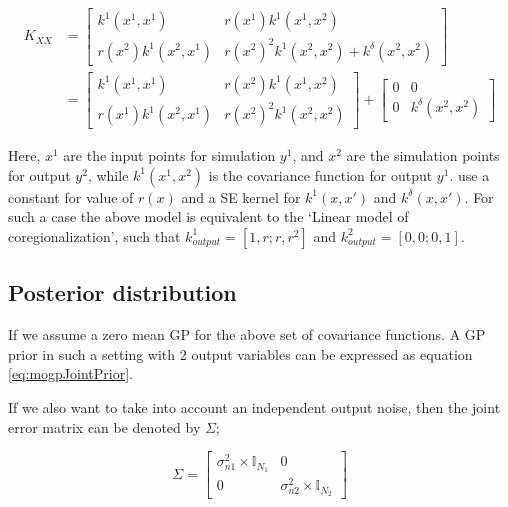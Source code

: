 \begin{equation}\label{eqJointCovarianceMultiFidelity}
         \begin{aligned}
           K_{XX}   & = \begin{bmatrix} k^{1}(x^{1}, x^{1}) & r(x^{1})k^{1}(x^{1}, x^{2})   \\
           r(x^{2})k^{1}(x^{2}, x^{1}) & r(x^{2})^2k^{1}(x^{2}, x^{2}) + k^{\delta}(x^{2}, x^{2}) \end{bmatrix} \\ 
           & = \begin{bmatrix} k^{1}(x^{1}, x^{1}) & r(x^{2})k^{1}(x^{1}, x^{2})   \\ r(x^{1})k^{1}(x^{2}, x^{1}) & r(x^{2})^2k^{1}(x^{2}, x^{2}) \end{bmatrix} 
           +  
\begin{bmatrix} 0 & 0 \\ 0 & k^{\delta}(x^{2}, x^{2}) \end{bmatrix} 
         \end{aligned}
\end{equation}

Here, $x^{1}$ are the input points for simulation $y^{1}$, and $x^{2}$ are the simulation points for output $y^{2}$, while $k^{1}(x^{1}, x^{2})$ is the covariance function for output $y^{1}$. \cite{kennedy2000predicting} use a constant for value of $r(x)$ and a SE kernel for $k^{1}(x, x')$ and $k^{\delta}(x, x')$.  For such a case the above model is equivalent to the `Linear model of coregionalization', such that $k_{output}^{1} = [1, r; r, r^2]$  and $k_{output}^{2} = [0, 0; 0, 1]$.

\subsection{Posterior distribution}\label{subsecPosteriorDistribution}
If we assume a zero mean GP for the above set of covariance functions. A GP prior in such a setting with 2 output variables can be expressed as equation \ref{eq:mogpJointPrior}.     

If we also want to take into account an independent output noise, then the joint error matrix can be denoted by \(\Sigma\);

\begin{equation}\label{eq:sigmaToError}
         \Sigma = 
          \begin{bmatrix}
          \sigma _{n1}^{2} \times \mathbb{I}_{N_{1}} & 0 \\ 
          0 & \sigma _{n2}^{2} \times \mathbb{I}_{N_{2}}
          \end{bmatrix} 
\end{equation}
         
